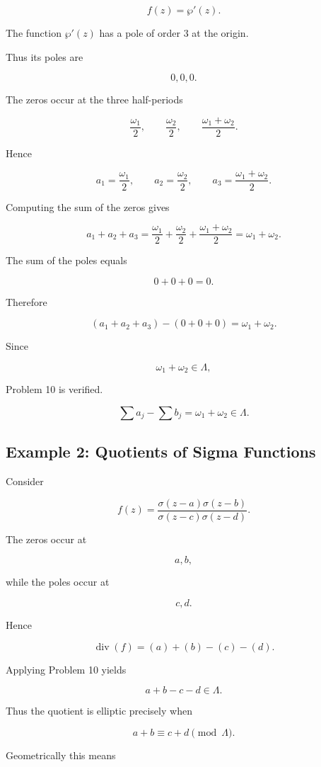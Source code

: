\documentclass[12pt,a4paper]{article}
\theoremstyle{notespace}
\begin{document}
\[
f(z)=\wp'(z).
\]

The function \(\wp'(z)\) has a pole of order \(3\) at the origin.

Thus its poles are

\[
0,0,0.
\]

The zeros occur at the three half-periods

\[
\frac{\omega_1}{2},
\qquad
\frac{\omega_2}{2},
\qquad
\frac{\omega_1+\omega_2}{2}.
\]

Hence

\[
a_1=\frac{\omega_1}{2},
\qquad
a_2=\frac{\omega_2}{2},
\qquad
a_3=\frac{\omega_1+\omega_2}{2}.
\]

Computing the sum of the zeros gives

\[
a_1+a_2+a_3
=
\frac{\omega_1}{2}
+
\frac{\omega_2}{2}
+
\frac{\omega_1+\omega_2}{2}
=
\omega_1+\omega_2.
\]

The sum of the poles equals

\[
0+0+0=0.
\]

Therefore

\[
(a_1+a_2+a_3)
-
(0+0+0)
=
\omega_1+\omega_2.
\]

Since

\[
\omega_1+\omega_2\in\Lambda,
\]

Problem 10 is verified.

\[
\boxed{
	\sum a_j-\sum b_j
	=
	\omega_1+\omega_2
	\in\Lambda.
}
\]

\subsection{Example 2: Quotients of Sigma Functions}

Consider

\[
f(z)
=
\frac{\sigma(z-a)\sigma(z-b)}
{\sigma(z-c)\sigma(z-d)}.
\]

The zeros occur at

\[
a,b,
\]

while the poles occur at

\[
c,d.
\]

Hence

\[
\operatorname{div}(f)
=
(a)+(b)-(c)-(d).
\]

Applying Problem 10 yields

\[
a+b-c-d\in\Lambda.
\]

Thus the quotient is elliptic precisely when

\[
a+b\equiv c+d
\pmod{\Lambda}.
\]

Geometrically this means
\end{document}
